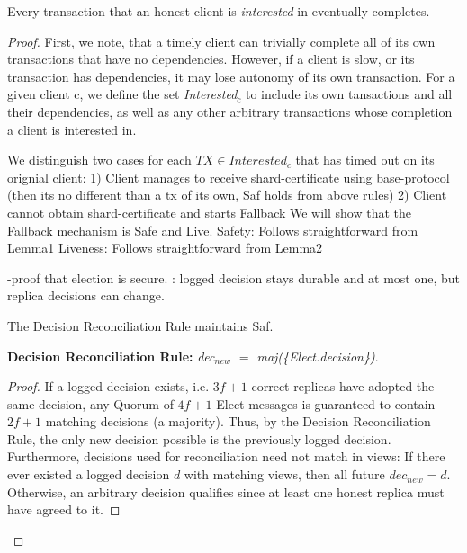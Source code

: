 \begin{theorem}[Liv] 
Every transaction that an honest client is \textit{interested} in eventually completes.
\end{theorem}

\begin{proof}
First, we note, that a timely client can trivially complete all of its own transactions that have no dependencies. However, if a client is slow, or its transaction has dependencies, it may lose autonomy of its own transaction. For a given client c, we define the set \textit{Interested$_c$} to include its own tansactions and all their dependencies, as well as any other arbitrary transactions whose completion a client is interested in. 

We distinguish two cases for each $TX \in Interested_c$ that has timed out on its orignial client: 
1) Client manages to receive shard-certificate using base-protocol (then its no different than a tx of its own, Saf holds from above rules)
2) Client cannot obtain shard-certificate and starts Fallback
We will show that the Fallback mechanism is Safe and Live.
Safety: Follows straightforward from Lemma1
Liveness: Follows straightforward from Lemma2



-proof that election is secure. : logged decision stays durable and at most one, but replica decisions can change.


\begin{lemma}
The Decision Reconciliation Rule maintains Saf.
\end{lemma}

\textbf{Decision Reconciliation Rule:} \textit{dec$_{new}$ $=$ maj(\{Elect.decision\})}. 

\begin{proof} If a logged decision exists, i.e. $3f+1$ correct replicas have adopted the same decision, any Quorum of $4f+1$ Elect messages is guaranteed to contain $2f+1$ matching decisions (a majority). Thus, by the Decision Reconciliation Rule, the only new decision possible is the previously logged decision. Furthermore, decisions used for reconciliation need not match in views: If there ever existed a logged decision $d$ with matching views, then all future $dec_{new} = d$.\\

 Otherwise, an arbitrary decision qualifies since at least one honest replica must have agreed to it.
\end{proof}
 



\end{proof}
